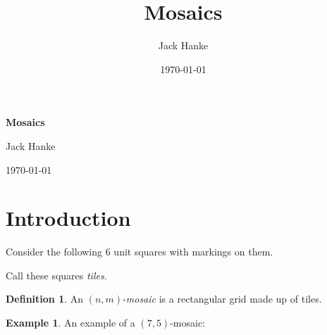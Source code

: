 \documentclass[12pt]{article}
\title{Mosaics}
\author{Jack Hanke}
\date{\today}
\theoremstyle{plain}
\theoremstyle{definition}
\theoremstyle{remark}
\theoremstyle{definition}
\newtheorem{definition}{Definition}[section]
\newtheorem{exmp}{Example}[section]
\newcommand{\cellA}[4]{ \draw[thick] ( #1 , #2 ) rectangle ( #3 , #4 ); \draw[red, thick] (#3 * 0.5 + #1 * 0.5 , #2) -- (#3, #4 * 0.5 + #2 * 0.5);}
\newcommand{\cellB}[4]{ \draw[thick] ( #1 , #2 ) rectangle ( #3 , #4 ); \draw[red, thick] (#3 * 0.5 + #1 * 0.5 , #2) -- (#1, #4 * 0.5 + #2 * 0.5);}
\newcommand{\cellC}[4]{ \draw[thick] ( #1 , #2 ) rectangle ( #3 , #4 ); \draw[red, thick] (#3 * 0.5 + #1 * 0.5 , #4) -- (#1, #4 * 0.5 + #2 * 0.5);}
\newcommand{\cellD}[4]{ \draw[thick] ( #1 , #2 ) rectangle ( #3 , #4 ); \draw[red, thick] (#3 * 0.5 + #1 * 0.5 , #4) -- (#3, #4 * 0.5 + #2 * 0.5);}
\newcommand{\cellE}[4]{ \draw[thick] ( #1 , #2 ) rectangle ( #3 , #4 ); \draw[red, thick] (#3 * 0.5 + #1 * 0.5 , #2) -- (#3 * 0.5 + #1 * 0.5 , #4);}
\newcommand{\cellF}[4]{ \draw[thick] ( #1 , #2 ) rectangle ( #3 , #4 ); \draw[red, thick] (#3, #4 * 0.5 + #2 * 0.5) -- (#1, #4 * 0.5 + #2 * 0.5);}
\begin{document}
\begin{center}
    \Large
    \textbf{Mosaics}
    
    \vspace{0.4cm}
    \large
    
    Jack Hanke   
    \vspace{0.4cm}
    
    \today
    \vspace{0.4cm}    
\end{center}

\section{Introduction}

Consider \cite{oeis} \cite{Hong_2018} \cite{10.5555/1717824} \cite{Bna2006AWT} the following $6$ unit squares with markings on them.

\begin{center}
\end{center}

Call these squares \textit{tiles}. 

\begin{definition}
An $(n,m)$-\textit{mosaic} is a rectangular grid made up of tiles.
\end{definition}

\begin{exmp}
An example of a $(7,5)$-mosaic:
\begin{center}
\end{center}
\end{exmp}
\end{document}
